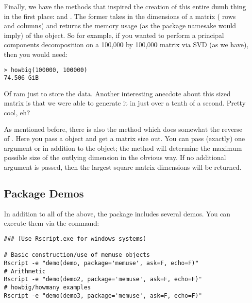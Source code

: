 Finally, we have the methods that inspired the creation of this entire dumb thing in the first place:   and .  The former takes in the dimensions of a matrix ( rows and  columns) and returns the memory usage (as the package namesake would imply) of the object.  So for example, if you wanted to perform a principal components decomposition on a 100,000 by 100,000 matrix via SVD (as we have), then you would need:
\begin{lstlisting}
> howbig(100000, 100000)
74.506 GiB
\end{lstlisting}
Of ram just to store the data.  Another interesting anecdote about this sized matrix is that we were able to generate it in just over a tenth of a second.  Pretty cool, eh?

As mentioned before, there is also the  method which does somewhat the reverse of .  Here you pass a  object and get a matrix size out.  You can pass (exactly) one argument  or  in addition to the  object; the method will determine the maximum possible size of the outlying dimension in the obvious way.  If no additional argument is passed, then the largest square matrix dimensions will be returned.



\subsection{Package Demos}

In addition to all of the above, the  package includes several demos.  You can execute them via the command:
\begin{lstlisting}[title=List of Demos]
### (Use Rscript.exe for windows systems)

# Basic construction/use of memuse objects
Rscript -e "demo(demo, package='memuse', ask=F, echo=F)"
# Arithmetic
Rscript -e "demo(demo2, package='memuse', ask=F, echo=F)"
# howbig/howmany examples
Rscript -e "demo(demo3, package='memuse', ask=F, echo=F)"
\end{lstlisting}
